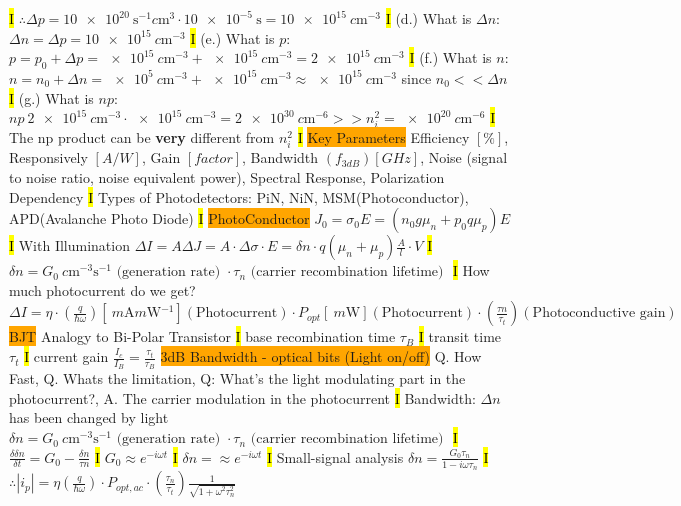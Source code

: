 \documentclass[fontsize=3]{scrartcl}
\begin{document}
\hl{I}
$\therefore \Delta p = \SI{10e20}{\second^{-1} c \meter^3} \cdot \SI{10e-5}{\second} = \SI{10e15}{c \meter^{-3}} $
\hl{I}
(d.) What is $\Delta n$: $\Delta n = \Delta p = \SI{10e15}{c \meter^{-3}} $
\hl{I}
(e.) What is $p$: $p = p_0 + \Delta p = \SI{e15}{c \meter^{-3}} + \SI{e15}{c \meter^{-3}} = \SI{2e15}{c \meter^{-3}}$
\hl{I}
(f.) What is $n$: $n = n_0 + \Delta n =  \SI{e5}{c \meter^{-3}} + \SI{e15}{c \meter^{-3}} \approx \SI{e15}{c \meter^{-3}}$ since $n_0 << \Delta n$
\hl{I}
(g.) What is $np$: $np ~ \SI{2e15}{c \meter^{-3}} \cdot \SI{e15}{c \meter^{-3}} = \SI{2e30}{c \meter^{-6}} >> n_i^2 = \SI{e20}{c \meter^{-6}}$
\hl{I}
The np product can be \textbf{very} different from $n_i^2$
\hl{I}
\colorbox{Orange}{Key Parameters} 
Efficiency  $[ \% ]$, Responsively $[ A/W ]$, Gain $[ factor ]$, Bandwidth $(f_{3dB})[GHz]$, Noise (signal to noise ratio, noise equivalent power), Spectral Response, Polarization Dependency 
\hl{I}
Types of Photodetectors: PiN, NiN, MSM(Photoconductor), APD(Avalanche Photo Diode)
\hl{I}
\colorbox{Orange}{PhotoConductor} 
$J_0 = \sigma_0 E = (n_0 g \mu_n + p_0 q \mu_p)E$
\hl{I}
With Illumination $\Delta I = A \Delta J = A \cdot \Delta \sigma \cdot E = \delta n \cdot q (\mu_n + \mu_p)\frac{A}{l} \cdot V$
\hl{I}
$\delta n = G_0 \SI{}{c \meter^{-3} \second^{-1} } \text{ (generation rate) } \cdot \tau_n \text{ (carrier recombination lifetime) } $
\hl{I}
How much photocurrent do we get? $\Delta I = \eta \cdot (\frac{q}{\hbar \omega} )  [ \SI{}{ m \ampere m \watt^{-1} } ] (\text{Photocurrent}) \cdot P_{opt}  [ \SI{}{ m \watt } ] (\text{Photocurrent}) \cdot (\frac{\tau n}{\tau_t}) (\text{Photoconductive gain})$
\colorbox{Orange}{BJT}
Analogy to Bi-Polar Transistor
\hl{I}
base recombination time $\tau_B$
\hl{I}
transit time $\tau_t$
\hl{I}
current gain $\frac{I_c}{I_B} = \frac{\tau_t}{\tau_B}$
\colorbox{Orange}{3dB Bandwidth - optical bits (Light on/off)} 
Q. How Fast, Q. Whats the limitation, Q: What's the light modulating part in the photocurrent?, A. The carrier modulation in the photocurrent
\hl{I}
Bandwidth: $\Delta n$ has been changed by light
$\delta n = G_0 \SI{}{c \meter^{-3} \second^{-1} } \text{ (generation rate) } \cdot \tau_n \text{ (carrier recombination lifetime) } $
\hl{I}
$\frac{\delta \delta n}{\delta t} = G_0 - \frac{\delta n}{\tau n}$
\hl{I}
$G_0 \approx e^{-i \omega t}$
\hl{I}
$\delta n = \approx e^{-i \omega t}$
\hl{I}
Small-signal analysis $\delta n = \frac{G_0 \tau_n}{1 - i\omega \tau_n}$
\hl{I}
$\therefore |i_p| = \eta (\frac{q}{\hbar \omega}) \cdot P_{opt,ac} \cdot (\frac{\tau_n}{\tau_t}) \frac{1}{\sqrt{1+ \omega^2 \tau_n^2}}$
\end{document}
